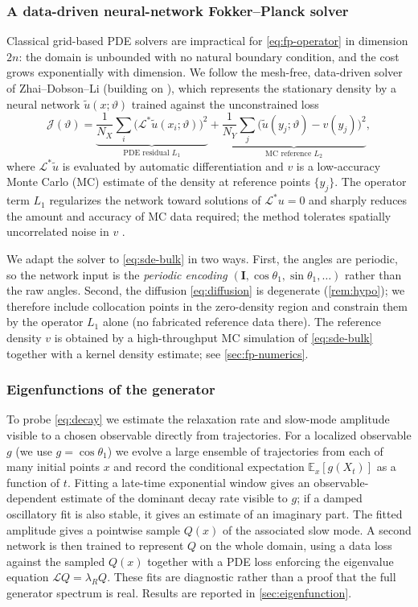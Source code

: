\documentclass[11pt,a4paper]{article}
\theoremstyle{definition}
\newcommand{\E}{\mathbb{E}}
\numberwithin{equation}{section}   %
\newcommand{\bI}{\mathbf{I}}
\newcommand{\Lgen}{\mathcal{L}}
\newcommand{\Ladj}{\mathcal{L}^{*}}
\begin{document}
\subsubsection{A data-driven neural-network Fokker--Planck solver}
Classical grid-based PDE solvers are impractical for \eqref{eq:fp-operator} in
dimension $2n$: the domain is unbounded with no natural boundary condition, and
the cost grows exponentially with dimension. We follow the mesh-free,
data-driven solver of Zhai--Dobson--Li \cite{ZhaiDobsonLi} (building on
\cite{Li2019,DobsonLiZhai}), which represents the stationary density by a neural
network $\tilde u(x;\vartheta)$ trained against the unconstrained loss
\begin{equation}\label{eq:nn-loss}
  \mathcal{J}(\vartheta)
  = \underbrace{\frac{1}{N_X}\sum_{i}\big(\Ladj \tilde u(x_i;\vartheta)\big)^2}_{\text{PDE residual } L_1}
  + \underbrace{\frac{1}{N_Y}\sum_{j}\big(\tilde u(y_j;\vartheta)-v(y_j)\big)^2}_{\text{MC reference } L_2},
\end{equation}
where $\Ladj\tilde u$ is evaluated by automatic differentiation and $v$ is a
low-accuracy Monte Carlo (MC) estimate of the density at reference points
$\{y_j\}$. The operator term $L_1$ regularizes the network toward solutions of
$\Ladj u=0$ and sharply reduces the amount and accuracy of MC data required;
the method tolerates spatially uncorrelated noise in $v$ \cite{ZhaiDobsonLi}.

We adapt the solver to \eqref{eq:sde-bulk} in two ways. First, the angles are
periodic, so the network input is the \emph{periodic encoding}
$(\bI,\cos\theta_1,\sin\theta_1,\dots)$ rather than the raw angles. Second, the
diffusion \eqref{eq:diffusion} is degenerate (\cref{rem:hypo}); we therefore
include collocation points in the zero-density region and constrain them by the
operator $L_1$ alone (no fabricated reference data there). The reference density
$v$ is obtained by a high-throughput MC simulation of \eqref{eq:sde-bulk}
together with a kernel density estimate; see \cref{sec:fp-numerics}.

\subsubsection{Eigenfunctions of the generator}
To probe \eqref{eq:decay} we estimate the relaxation rate and slow-mode
amplitude visible to a chosen observable directly from trajectories. For a
localized observable $g$ (we use $g=\cos\theta_1$) we evolve a large ensemble
of trajectories from each of many initial points $x$ and record the conditional
expectation $\E_x[g(X_t)]$ as a function of $t$. Fitting a late-time
exponential window gives an
observable-dependent estimate of the dominant decay rate visible to $g$; if a
damped oscillatory fit is also stable, it gives an estimate of an imaginary
part. The fitted amplitude gives a pointwise sample $Q(x)$ of the associated
slow mode. A second network is then trained to represent $Q$ on the whole
domain, using a data loss against the sampled $Q(x)$ together with a PDE loss
enforcing the eigenvalue equation $\Lgen Q=\lambda_R Q$. These fits are
diagnostic rather than a proof that the full generator spectrum is real. Results
are reported in
\cref{sec:eigenfunction}.
\end{document}
